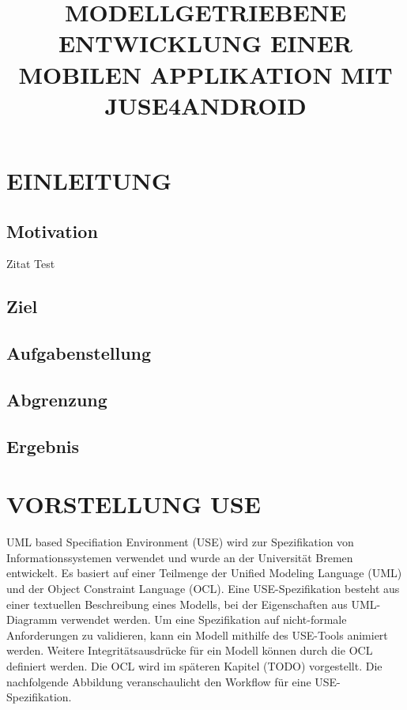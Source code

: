 \documentclass[a4paper,twoside]{article}
\begin{document}
\title{\uppercase{Modellgetriebene Entwicklung einer mobilen Applikation mit JUSE4Android}}

\author{
}




\onecolumn \maketitle \normalsize \vfill

\section{\uppercase{Einleitung}}
\label{sec:introduction}

\subsection{Motivation}
\noindent Zitat Test
\cite{SilvaMasterThesis}

\subsection{Ziel}
\noindent 

\subsection{Aufgabenstellung}
\noindent 

\subsection{Abgrenzung}

\subsection{Ergebnis}

\section{\uppercase{Vorstellung USE}}

UML based Specifiation Environment (USE) wird zur Spezifikation von Informationssystemen verwendet und wurde an der Universität Bremen entwickelt. Es basiert auf einer Teilmenge der Unified Modeling Language (UML) und der Object Constraint Language (OCL). Eine USE-Spezifikation besteht aus einer textuellen Beschreibung eines Modells, bei der Eigenschaften aus UML-Diagramm verwendet werden. Um eine Spezifikation auf nicht-formale Anforderungen zu validieren, kann ein Modell mithilfe des USE-Tools animiert werden. Weitere Integritätsausdrücke für ein Modell können durch die OCL definiert werden. \cite{Use07} Die OCL wird im späteren Kapitel (TODO) vorgestellt. Die nachfolgende Abbildung veranschaulicht den Workflow für eine USE-Spezifikation.
\end{document}
